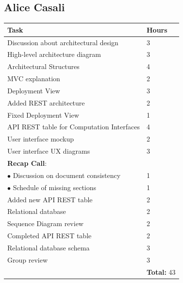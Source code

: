 \documentclass{report}
\begin{document}
\subsection*{Alice Casali}
\begin{table}[!ht]
	\begin{tabular}{|C{.60\textwidth}||C{.20\textwidth}|}
		\toprule
        \textbf{Task} & \textbf{Hours}\\
        \midrule
        Discussion about architectural design & 3\\
        \midrule
        High-level architecture diagram & 3\\
        \midrule
        Architectural Structures & 4\\
        \midrule
        MVC explanation & 2\\
        \midrule
        Deployment View & 3\\
        \midrule
        Added REST architecture & 2 \\
        \midrule
        Fixed Deployment View & 1\\
        \midrule
        API REST table for Computation Interfaces & 4\\
		\midrule
		User interface mockup & 2\\
        \midrule
        User interface UX diagrams & 3\\
        \midrule
		\small{\textbf{Recap Call}}: & \\
		\vspace{.2mm}
		$\bullet$ Discussion on document consistency & \vspace{.2mm} 1\\
        $\bullet$ Schedule of missing sections & 1\\
        \midrule
        Added new API REST table & 2\\
        \midrule
        Relational database & 2\\
        \midrule
		Sequence Diagram review & 2\\
        \midrule
        Completed API REST table & 2\\
        \midrule
        Relational database schema & 3\\
        \midrule
        Group review & 3\\
        \midrule
		& \textbf{Total:} 43\\
		\bottomrule
	\end{tabular}
\end{table}
\clearpage
\end{document}
